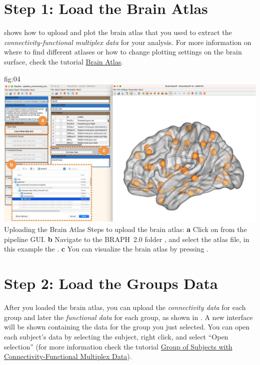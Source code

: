 \documentclass[justified]{tufte-handout}
\begin{document}
\clearpage
\section{Step 1: Load the Brain Atlas}

 shows how to upload and plot the brain atlas that you used to extract the \emph{connectivity-functional multiplex data} for your analysis. For more information on where to find different atlases or how to change plotting settings on the brain surface, check the tutorial \href{https://github.com/braph-software/BRAPH-2/tree/develop/tutorials/general/tut_ba}{Brain Atlas}.

	{fig:04}
	{
	\includegraphics{fig04.jpg}
	}
	{Uploading the Brain Atlas}
	{
	Steps to upload the brain atlas:
	{\bf a} Click on  from the pipeline GUI.
	{\bf b} Navigate to the BRAPH~2.0 folder , and select the atlas file, in this example the .  
	{\bf c} You can visualize the brain atlas by pressing . 
	}
 
\clearpage
\section{Step 2: Load the Groups Data}

After you loaded the brain atlas, you can upload the \emph{connectivity data} for each group and later the \emph{functional data} for each group, as shown in . A new interface will be shown containing the data for the group you just selected. You can open each subject’s data by selecting the subject, right click, and select “Open selection” (for more information check the tutorial \href{https://github.com/braph-software/BRAPH-2/tree/develop/tutorials/general/tut_gr_con_fun_mp}{Group of Subjects with Connectivity-Functional Multiplex Data}).
\end{document}
